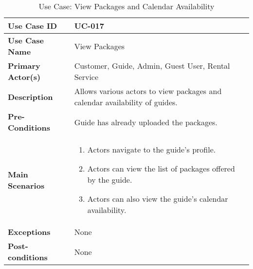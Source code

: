 \begin{table}[ht]
    \centering
    \begin{tabular}{|l|p{}|}
        \hline
        \textbf{Use Case ID} & UC-017 \\
        \hline
        \textbf{Use Case Name} & View Packages \\
        \hline
        \textbf{Primary Actor(s)} & Customer, Guide, Admin, Guest User, Rental Service \\
        \hline
        \textbf{Description} & Allows various actors to view packages and calendar availability of guides. \\
        \hline
        \textbf{Pre-Conditions} & Guide has already uploaded the packages. \\
        \hline
        \textbf{Main Scenarios} & 
        \begin{enumerate}[label=\arabic*.,itemsep=0pt]
            \item Actors navigate to the guide's profile.
            \item Actors can view the list of packages offered by the guide.
            \item Actors can also view the guide's calendar availability.
        \end{enumerate} \\
        \hline
        \textbf{Exceptions} & None \\
        \hline
        \textbf{Post-conditions} & None \\
        \hline
    \end{tabular}
    \label{tab:use-case-view-packages}
    \caption{Use Case: View Packages and Calendar Availability}
\end{table}


